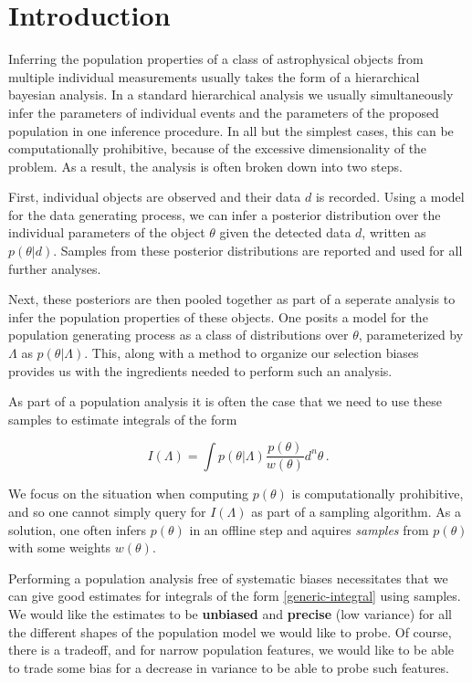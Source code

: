 \documentclass[twocolumn,usenames,dvipsnames,linenumbers]{aastex631}
\begin{document}
\section{Introduction}
 Inferring the population properties of a class of astrophysical objects from multiple individual measurements usually takes the form of a hierarchical bayesian analysis. In a standard hierarchical analysis we usually simultaneously infer the parameters of individual events and the parameters of the proposed population in one inference procedure. In all but the simplest cases, this can be computationally prohibitive, because of the excessive dimensionality of the problem. As a result, the analysis is often broken down into two steps. 

First, individual objects are observed and their data $d$ is recorded. Using a model for the data generating process, we can infer a posterior distribution over the individual parameters of the object $\theta$ given the detected data $d$, written as $p(\theta | d)$. Samples from these posterior distributions are reported and used for all further analyses.

Next, these posteriors are then pooled together as part of a seperate analysis to infer the population properties of these objects. One posits a model for the population generating process as a class of distributions over $\theta$, parameterized by $\Lambda$ as $p(\theta | \Lambda)$. This, along with a method to organize our selection biases provides us with the ingredients needed to perform such an analysis. 

As part of a population analysis it is often the case that we need to use these samples to estimate integrals of the form

\begin{equation}
	\label{generic-integral}
	I(\Lambda) = \int p(\theta | \Lambda) \frac{p(\theta)}{w(\theta)} d^n\theta\, .
\end{equation} 

We focus on the situation when computing $p(\theta)$ is computationally prohibitive, and so one cannot simply query for $I(\Lambda)$ as part of a sampling algorithm. As a solution, one often infers $p(\theta)$ in an offline step and aquires \textit{samples} from $p(\theta)$ with some weights $w(\theta)$. 

Performing a population analysis free of systematic biases necessitates that we can give good estimates for integrals of the form \eqref{generic-integral} using samples.  We would like the estimates to be \textbf{unbiased} and \textbf{precise} (low variance) for all the different shapes of the population model we would like to probe. Of course, there is a tradeoff, and for narrow population features, we would like to be able to trade some bias for a decrease in variance to be able to probe such features. 
\end{document}
